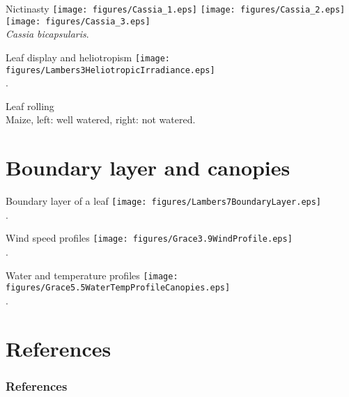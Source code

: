 \documentclass[10pt]{beamer}
\begin{document}
\begin{frame}{Nictinasty}
    \centering\texttt{[image: figures/Cassia\_1.eps]}%
    \texttt{[image: figures/Cassia\_2.eps]}%
    \texttt{[image: figures/Cassia\_3.eps]}\\
    \textit{Cassia bicapsularis}.
\end{frame}

\begin{frame}{Leaf display and heliotropism}
    \centering\texttt{[image: figures/Lambers3HeliotropicIrradiance.eps]}\\
    {\small \autocite[from][]{LambersEtAl1998}.}
\end{frame}

\begin{frame}{Leaf rolling}
    \\
    Maize, left: well watered, right: not watered.
\end{frame}

\section{Boundary layer and canopies}

\begin{frame}{Boundary layer of a leaf}
    \centering\texttt{[image: figures/Lambers7BoundaryLayer.eps]}\\
    {\small \autocite[from][]{LambersEtAl1998}.}
\end{frame}

\begin{frame}{Wind speed profiles}
    \centering\texttt{[image: figures/Grace3.9WindProfile.eps]}\\
    {\small \autocite[from][]{Grace1983}.}
\end{frame}

\begin{frame}{Water and temperature profiles}
    \centering\texttt{[image: figures/Grace5.5WaterTempProfileCanopies.eps]}\\
    {\small \autocite[from][]{Grace1983}.}
\end{frame}

\section*{References}

  \begin{frame}[t,allowframebreaks]
    \frametitle{References}
    \printbibliography
  \end{frame}
\end{document}
